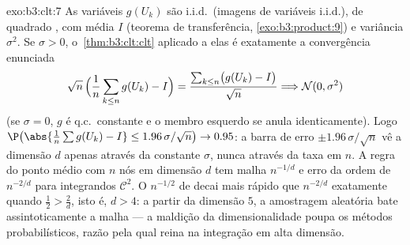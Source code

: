 \begin{solution}{exo:b3:clt:7}
As variáveis $g(U_k)$ são i.i.d.\ (imagens  de
variáveis i.i.d.), de quadrado , com média $I$
(teorema de transferência, \cref{exo:b3:product:9}) e variância
$\sigma^2$. Se $\sigma > 0$, o~\cref{thm:b3:clt:clt} aplicado
a elas é exatamente a convergência enunciada
\[
\sqrt n\,\Bigl(\frac1n\sum_{k\leq n}g(U_k) - I\Bigr) =
\frac{\sum_{k\leq n}\bigl(g(U_k) - I\bigr)}{\sqrt n}
\Longrightarrow \mathcal N(0, \sigma^2)
\]
(se $\sigma = 0$, $g$ é q.c.\ constante e o membro
esquerdo se anula identicamente). Logo
$\P\bigl(\abs{\frac1n\sum g(U_k) - I} \leq
1.96\,\sigma/\sqrt n\bigr) \to 0.95$: a barra de erro $\pm
1.96\,\sigma/\sqrt n$ vê a dimensão $d$ apenas através da
constante $\sigma$, nunca através da taxa em $n$. A
regra do ponto médio com $n$ nós em dimensão $d$ tem malha
$n^{-1/d}$ e erro da ordem de $n^{-2/d}$ para integrandos
$\mathcal C^2$. O $n^{-1/2}$ de  decai mais rápido que
$n^{-2/d}$ exatamente quando $\frac12 > \frac2d$, isto é, $d > 4$:
a partir da dimensão $5$, a amostragem aleatória bate
assintoticamente a malha --- a maldição da dimensionalidade poupa
os métodos probabilísticos, razão pela qual  reina
na integração em alta dimensão.
\end{solution}

